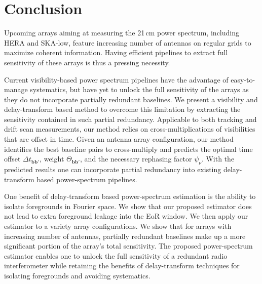 \documentclass[twocolumn,apj,numberedappendix]{emulateapj}
\renewcommand\[{\begin{equation}}
\renewcommand\]{\end{equation}}
\begin{document}

\section{Conclusion}
Upcoming arrays aiming at measuring the 21\,cm power spectrum, including HERA and SKA-low, feature increasing number of antennas on regular grids to maximize coherent information. Having efficient pipelines to extract full sensitivity of these arrays is thus a pressing necessity.
 
Current visibility-based power spectrum pipelines have the advantage of easy-to-manage systematics, but have yet to unlock the full sensitivity of the arrays as they do not incorporate partially redundant baselines.  We present a visibility and delay-transform based method to overcome this limitation by extracting the sensitivity contained in such partial redundancy. Applicable to both tracking and drift scan measurements, our method relies on cross-multiplications of visibilities that are offset in time. Given an antenna array configuration, our method identifies the best baseline pairs to cross-multiply and predicts the optimal time offset $\Delta t_{\boldsymbol{bb'}}$, weight $\Theta_{\boldsymbol{bb'}}$, and the necessary rephasing factor $\psi_\nu$. With the predicted results one can incorporate partial redundancy into existing delay-transform based power-spectrum pipelines. 

One benefit of delay-transform based power-spectrum estimation is the ability to isolate foregrounds in Fourier space. We show that our proposed estimator does not lead to extra foreground leakage into the EoR window. We then apply our estimator to a variety array configurations. We show that for arrays with increasing number of antennas, partially redundant baselines make up a more significant portion of the array's total sensitivity. The proposed power-spectrum estimator enables one to unlock the full sensitivity of a redundant radio interferometer while retaining the benefits of delay-transform techniques for isolating foregrounds and avoiding systematics. 
\end{document}
